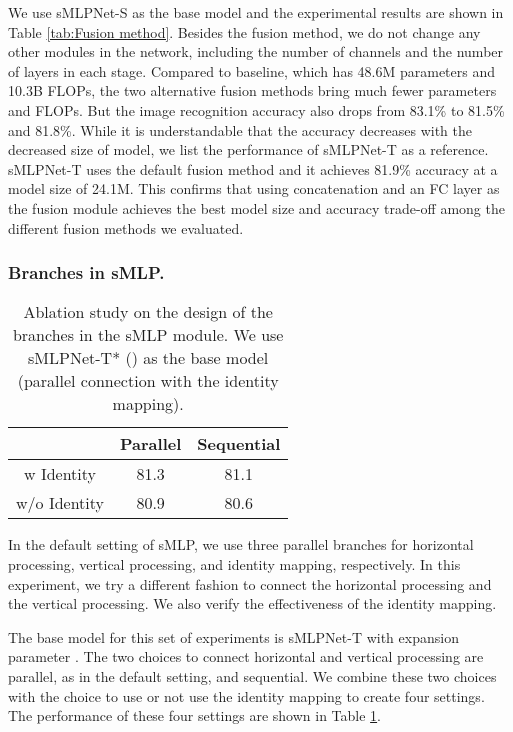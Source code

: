 \documentclass[letterpaper]{article} \usepackage{aaai22}  \usepackage{times}  \usepackage{helvet}  \usepackage{courier}  \usepackage[hyphens]{url}  \usepackage{graphicx} \usepackage{color}
\begin{document}
We use sMLPNet-S as the base model and the experimental results are shown in Table \ref{tab:Fusion method}. Besides the fusion method, we do not change any other modules in the network, including the number of channels and the number of layers in each stage. Compared to baseline, which has 48.6M parameters and 10.3B FLOPs, the two alternative fusion methods bring much fewer parameters and FLOPs. But the image recognition accuracy also drops from 83.1\% to 81.5\% and 81.8\%. While it is understandable that the accuracy decreases with the decreased size of model, we list the performance of sMLPNet-T as a reference. sMLPNet-T uses the default fusion method and it achieves 81.9\% accuracy at a model size of 24.1M. This confirms that using concatenation and an FC layer as the fusion module achieves the best model size and accuracy trade-off among the different fusion methods we evaluated. 

\subsubsection{Branches in sMLP.}
\begin{table}[t]
\centering
\begin{tabular}{c|c c}
    \hline
    & Parallel & Sequential \\
    \hline
    w Identity   &81.3 &81.1 \\
    w/o Identity &80.9 &80.6  \\
    \hline
\end{tabular}
\caption{Ablation study on the design of the branches in the sMLP module. We use sMLPNet-T* () as the base model (parallel connection with the identity mapping).}
\label{tab:Parallel versus Sequential}
\end{table}

In the default setting of sMLP, we use three parallel branches for horizontal processing, vertical processing, and identity mapping, respectively. In this experiment, we try a different fashion to connect the horizontal processing and the vertical processing. We also verify the effectiveness of the identity mapping. 

The base model for this set of experiments is sMLPNet-T with expansion parameter . The two choices to connect horizontal and vertical processing are parallel, as in the default setting, and sequential. We combine these two choices with the choice to use or not use the identity mapping to create four settings. The performance of these four settings are shown in Table \ref{tab:Parallel versus Sequential}. 
\end{document}
